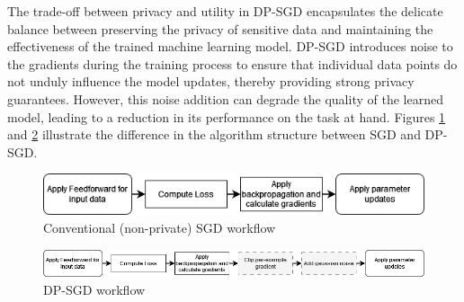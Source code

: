 \documentclass[11pt]{article}
\begin{document}
The trade-off between privacy and utility in DP-SGD encapsulates the delicate balance between preserving the privacy of sensitive data and maintaining the effectiveness of the trained machine learning model. DP-SGD introduces noise to the gradients during the training process to ensure that individual data points do not unduly influence the model updates, thereby providing strong privacy guarantees. However, this noise addition can degrade the quality of the learned model, leading to a reduction in its performance on the task at hand. Figures \ref{fig:sgd} and \ref{fig:dpsgd} illustrate the difference in the algorithm structure between SGD and DP-SGD.

\begin{figure}[h]
\centering
    \includegraphics[width=0.7\linewidth]{submissions/submission5/figs/sgd.drawio.png}
   \caption{Conventional (non-private) SGD workflow}
   \label{fig:sgd}
\end{figure} 
\begin{figure}[h]
\centering
    \includegraphics[width=1\linewidth]{submissions/submission5/figs/dpsgd.drawio.png}
   \caption{DP-SGD workflow}
   \label{fig:dpsgd}
\end{figure} 

\iffalse
\end{document}
